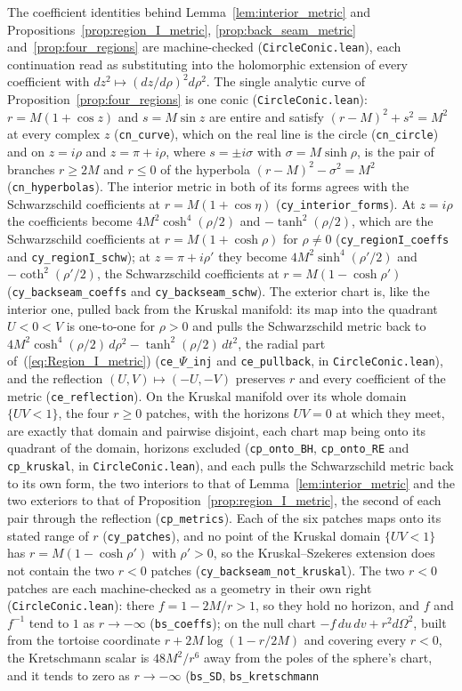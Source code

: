 \documentclass[11pt,a4paper]{article}
\theoremstyle{definition}
\begin{document}
The coefficient identities behind Lemma~\ref{lem:interior_metric} and Propositions~\ref{prop:region_I_metric}, \ref{prop:back_seam_metric} and~\ref{prop:four_regions} are machine-checked (\texttt{CircleConic.lean}), each continuation read as substituting into the holomorphic extension of every coefficient with $dz^{2}\mapsto(dz/d\rho)^{2}d\rho^{2}$. The single analytic curve of Proposition~\ref{prop:four_regions} is one conic (\texttt{CircleConic.lean}): $r=M(1+\cos z)$ and $s=M\sin z$ are entire and satisfy $(r-M)^{2}+s^{2}=M^{2}$ at every complex $z$ (\texttt{cn\_curve}), which on the real line is the circle (\texttt{cn\_circle}) and on $z=i\rho$ and $z=\pi+i\rho$, where $s=\pm i\sigma$ with $\sigma=M\sinh\rho$, is the pair of branches $r\ge2M$ and $r\le0$ of the hyperbola $(r-M)^{2}-\sigma^{2}=M^{2}$ (\texttt{cn\_hyperbolas}). The interior metric in both of its forms agrees with the Schwarzschild coefficients at $r=M(1+\cos\eta)$ (\texttt{cy\_interior\_forms}). At $z=i\rho$ the coefficients become $4M^{2}\cosh^{4}(\rho/2)$ and $-\tanh^{2}(\rho/2)$, which are the Schwarzschild coefficients at $r=M(1+\cosh\rho)$ for $\rho\neq0$ (\texttt{cy\_regionI\_coeffs} and \texttt{cy\_regionI\_schw}); at $z=\pi+i\rho'$ they become $4M^{2}\sinh^{4}(\rho'/2)$ and $-\coth^{2}(\rho'/2)$, the Schwarzschild coefficients at $r=M(1-\cosh\rho')$ (\texttt{cy\_backseam\_coeffs} and \texttt{cy\_backseam\_schw}). The exterior chart is, like the interior one, pulled back from the Kruskal manifold: its map into the quadrant $U<0<V$ is one-to-one for $\rho>0$ and pulls the Schwarzschild metric back to $4M^{2}\cosh^{4}(\rho/2)\,d\rho^{2}-\tanh^{2}(\rho/2)\,dt^{2}$, the radial part of~(\ref{eq:Region_I_metric}) (\texttt{ce\_$\Psi$\_inj} and \texttt{ce\_pullback}, in \texttt{CircleConic.lean}), and the reflection $(U,V)\mapsto(-U,-V)$ preserves $r$ and every coefficient of the metric (\texttt{ce\_reflection}). On the Kruskal manifold over its whole domain $\{UV<1\}$, the four $r\ge0$ patches, with the horizons $UV=0$ at which they meet, are exactly that domain and pairwise disjoint, each chart map being onto its quadrant of the domain, horizons excluded (\texttt{cp\_onto\_BH}, \texttt{cp\_onto\_RE} and \texttt{cp\_kruskal}, in \texttt{CircleConic.lean}), and each pulls the Schwarzschild metric back to its own form, the two interiors to that of Lemma~\ref{lem:interior_metric} and the two exteriors to that of Proposition~\ref{prop:region_I_metric}, the second of each pair through the reflection (\texttt{cp\_metrics}). Each of the six patches maps onto its stated range of $r$ (\texttt{cy\_patches}), and no point of the Kruskal domain $\{UV<1\}$ has $r=M(1-\cosh\rho')$ with $\rho'>0$, so the Kruskal--Szekeres extension does not contain the two $r<0$ patches (\texttt{cy\_backseam\_not\_kruskal}). The two $r<0$ patches are each machine-checked as a geometry in their own right (\texttt{CircleConic.lean}): there $f=1-2M/r>1$, so they hold no horizon, and $f$ and $f^{-1}$ tend to $1$ as $r\to-\infty$ (\texttt{bs\_coeffs}); on the null chart $-f\,du\,dv+r^{2}d\Omega^{2}$, built from the tortoise coordinate $r+2M\log(1-r/2M)$ and covering every $r<0$, the Kretschmann scalar is $48M^{2}/r^{6}$ away from the poles of the sphere's chart, and it tends to zero as $r\to-\infty$ (\texttt{bs\_SD}, \texttt{bs\_kretschmann} 
\end{document}
